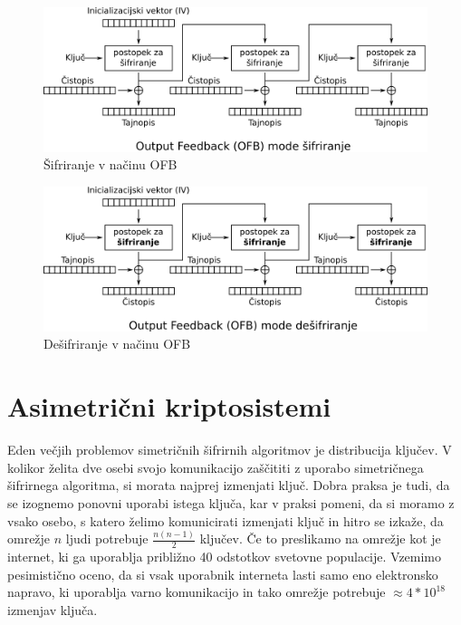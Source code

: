 \documentclass[12pt,a4paper,openany,tikz]{book}
\theoremstyle{plain}
\theoremstyle{definition}
\begin{document}
\begin{figure}[ht!]
  \centering
    \includegraphics[width=\textwidth]{images/OFB_encryption}
    \caption{Šifriranje v načinu OFB}
\label{fig:ofbenc}
\end{figure}

\begin{figure}[ht!]
  \centering
    \includegraphics[width=\textwidth]{images/OFB_decryption}
    \caption{Dešifriranje v načinu OFB}
\label{fig:ofbdec}
\end{figure}

\section{Asimetrični kriptosistemi}
\label{sec:Asimetrični kriptosistemi}

Eden večjih problemov simetričnih šifrirnih algoritmov je distribucija ključev. V kolikor želita dve osebi svojo komunikacijo zaščititi z uporabo simetričnega šifrirnega algoritma, si morata najprej izmenjati ključ. Dobra praksa je tudi, da se izognemo ponovni uporabi istega ključa, kar v praksi pomeni, da si moramo z vsako osebo, s katero želimo komunicirati izmenjati ključ in hitro se izkaže, da omrežje $n$ ljudi potrebuje $\frac{n(n-1)}{2}$ ključev. Če to preslikamo na omrežje kot je internet, ki ga uporablja približno 40 odstotkov svetovne populacije. Vzemimo pesimistično oceno, da si vsak uporabnik interneta lasti samo eno elektronsko napravo, ki uporablja varno komunikacijo in tako omrežje potrebuje $\approx 4*10^{18}$ izmenjav ključa.
\end{document}
